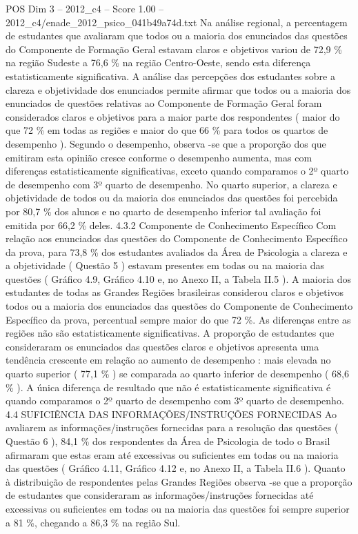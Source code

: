 \begin{textsample}{POS Dim 3 – 2012\_c4 – Score 1.00 – 2012\_c4/enade\_2012\_psico\_041b49a74d.txt}
Na análise regional, a percentagem de estudantes que avaliaram que todos ou a maioria dos enunciados das questões do Componente de Formação Geral estavam claros e objetivos variou de 72,9 \% na região Sudeste a 76,6 \% na região Centro-Oeste, sendo esta diferença estatisticamente significativa.
A análise das percepções dos estudantes sobre a clareza e objetividade dos enunciados permite afirmar que todos ou a maioria dos enunciados de questões relativas ao Componente de Formação Geral foram considerados claros e objetivos para a maior parte dos respondentes ( maior do que 72 \% em todas as regiões e maior do que 66 \% para todos os quartos de desempenho ).
Segundo o desempenho, observa -se que a proporção dos que emitiram esta opinião cresce conforme o desempenho aumenta, mas com diferenças estatisticamente significativas, exceto quando comparamos o 2º quarto de desempenho com 3º quarto de desempenho.
No quarto superior, a clareza e objetividade de todos ou da maioria dos enunciados das questões foi percebida por 80,7 \% dos alunos e no quarto de desempenho inferior tal avaliação foi emitida por 66,2 \% deles. 4.3.2 Componente de Conhecimento Específico Com relação aos enunciados das questões do Componente de Conhecimento Específico da prova, para 73,8 \% dos estudantes avaliados da Área de Psicologia a clareza e a objetividade ( Questão 5 ) estavam presentes em todas ou na maioria das questões ( Gráfico 4.9, Gráfico 4.10 e, no Anexo II, a Tabela II.5 ).
A maioria dos estudantes de todas as Grandes Regiões brasileiras considerou claros e objetivos todos ou a maioria dos enunciados das questões do Componente de Conhecimento Específico da prova, percentual sempre maior do que 72 \%.
As diferenças entre as regiões não são estatisticamente significativas.
A proporção de estudantes que consideraram os enunciados das questões claros e objetivos apresenta uma tendência crescente em relação ao aumento de desempenho : mais elevada no quarto superior ( 77,1 \% ) se comparada ao quarto inferior de desempenho ( 68,6 \% ).
A única diferença de resultado que não é estatisticamente significativa é quando comparamos o 2º quarto de desempenho com 3º quarto de desempenho. 4.4 SUFICIÊNCIA DAS INFORMAÇÕES/INSTRUÇÕES FORNECIDAS Ao avaliarem as informações/instruções fornecidas para a resolução das questões ( Questão 6 ), 84,1 \% dos respondentes da Área de Psicologia de todo o Brasil afirmaram que estas eram até excessivas ou suficientes em todas ou na maioria das questões ( Gráfico 4.11, Gráfico 4.12 e, no Anexo II, a Tabela II.6 ).
Quanto à distribuição de respondentes pelas Grandes Regiões observa -se que a proporção de estudantes que consideraram as informações/instruções fornecidas até excessivas ou suficientes em todas ou na maioria das questões foi sempre superior a 81 \%, chegando a 86,3 \% na região Sul.

\end{textsample}
